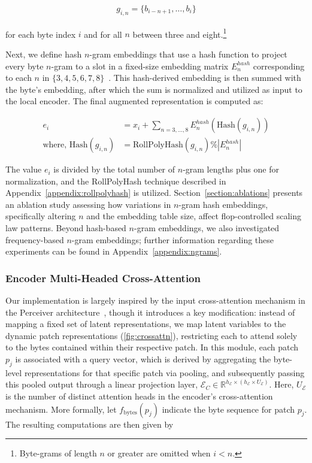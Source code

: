 \begin{align}
    g_{i,n}=\{b_{i-n + 1},\ldots, b_i\}
\end{align}

for each byte index $i$ and for all $n$ between three and eight.\footnote{
Byte-grams of length $n$ or greater are omitted when $i<n$. }

Next, we define hash $n$-gram embeddings that use a hash function to project every byte $n$-gram to a slot in a fixed-size embedding matrix $E_{n}^{hash}$ corresponding to each $n$ in $\{3,4,5,6,7,8\}$~\citep{bai2010learning}. This hash-derived embedding is then summed with the byte's embedding, after which the sum is normalized and utilized as input to the local encoder. The final augmented representation is computed as:

\begin{align}
e_i &= x_i + \sum_{n = 3,...,8}E_{n}^{hash}(\text{Hash}(g_{i,n})) \\
\text{where, Hash}(g_{i,n}) &= \text{RollPolyHash}(g_{i,n}) \% |E_{n}^{hash}|
\end{align}

The value $e_i$ is divided by the total number of $n$-gram lengths plus one for normalization, and the RollPolyHash technique described in Appendix~\ref{appendix:rollpolyhash} is utilized. Section~\ref{section:ablations} presents an ablation study assessing how variations in $n$-gram hash embeddings, specifically altering $n$ and the embedding table size, affect flop-controlled scaling law patterns. Beyond hash-based $n$-gram embeddings, we also investigated frequency-based $n$-gram embeddings; further information regarding these experiments can be found in Appendix~\ref{appendix:ngrams}.

\subsubsection{Encoder Multi-Headed Cross-Attention}
\label{sec:enc-cross-attn}
Our implementation is largely inspired by the input cross-attention mechanism in the Perceiver architecture~\citep{jaegle2021perceiver}, though it introduces a key modification: instead of mapping a fixed set of latent representations, we map latent variables to the dynamic patch representations (\autoref{fig:crossattn}), restricting each to attend solely to the bytes contained within their respective patch. In this module, each patch $p_j$ is associated with a query vector, which is derived by aggregating the byte-level representations for that specific patch via pooling, and subsequently passing this pooled output through a linear projection layer, $\mathcal{E}_{C} \in \mathbb{R}^{h_{\mathcal{E}} \times (h_{\mathcal{E}} \times U_{\mathcal{E}})}$. Here, $U_{\mathcal{E}}$ is the number of distinct attention heads in the encoder's cross-attention mechanism. More formally, let $f_{\text{bytes}}(p_j)$ indicate the byte sequence for patch $p_j$. The resulting computations are then given by

